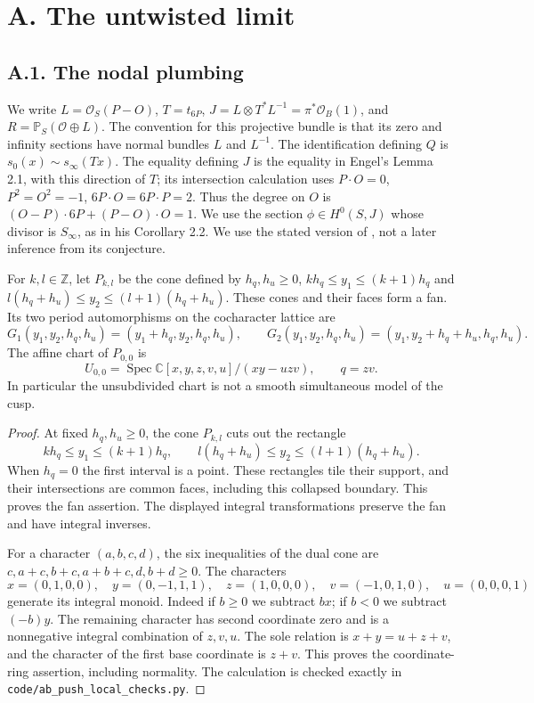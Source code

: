 \section{A. The untwisted limit}
\subsection{A.1. The nodal plumbing}

We write $L=\mathcal O_S(P-O)$, $T=t_{6P}$,
$J=L\otimes T^*L^{-1}=\pi^*\mathcal O_B(1)$, and
$R=\mathbb P_S(\mathcal O\oplus L)$. The convention for this projective
bundle is that its zero and infinity sections have normal bundles
$L$ and $L^{-1}$. The identification defining $Q$ is
$s_0(x)\sim s_\infty(Tx)$. The equality defining $J$ is the equality
in Engel's Lemma 2.1, with this direction of $T$; its intersection
calculation uses $P\cdot O=0$, $P^2=O^2=-1$,
$6P\cdot O=6P\cdot P=2$. Thus the degree on $O$ is
$(O-P)\cdot6P+(P-O)\cdot O=1$. We use the section
$\phi\in H^0(S,J)$ whose divisor is $S_\infty$, as in his
Corollary 2.2. We use the stated version of
\cite{E26}, not a later inference from its conjecture.

\begin{proposition}\label{push:src:A.1.1}\label{push:A11}
For $k,l\in\mathbb Z$, let $P_{k,l}$ be the cone defined by $h_q,h_u\geq0$, $kh_q\leq y_1\leq(k+1)h_q$ and $l(h_q+h_u)\leq y_2\leq(l+1)(h_q+h_u)$. These cones and their faces form a fan. Its two
period automorphisms on the cocharacter lattice are
\[
 G_1(y_1,y_2,h_q,h_u)=(y_1+h_q,y_2,h_q,h_u),\qquad
 G_2(y_1,y_2,h_q,h_u)=(y_1,y_2+h_q+h_u,h_q,h_u).
\]
The affine chart of $P_{0,0}$ is
\[
 U_{0,0}=\operatorname{Spec}\mathbb C[x,y,z,v,u]/(xy-uzv),
 \qquad q=zv.
\]
In particular the unsubdivided chart is not a smooth simultaneous
model of the cusp.
\end{proposition}
\begin{proof}
At fixed $h_q,h_u\geq0$, the cone $P_{k,l}$ cuts out the rectangle
\[
 kh_q\leq y_1\leq(k+1)h_q,\qquad
 l(h_q+h_u)\leq y_2\leq(l+1)(h_q+h_u).
\]
When $h_q=0$ the first interval is a point. These rectangles tile
their support, and their intersections are common faces, including
this collapsed boundary. This proves the fan assertion. The displayed
integral transformations preserve the fan and have integral inverses.

For a character $(a,b,c,d)$, the six inequalities of the dual cone
are $c,a+c,b+c,a+b+c,d,b+d\geq0$. The characters
\[
 x=(0,1,0,0),\quad y=(0,-1,1,1),\quad
 z=(1,0,0,0),\quad v=(-1,0,1,0),\quad u=(0,0,0,1)
\]
generate its integral monoid. Indeed if $b\geq0$ we subtract $b x$;
if $b<0$ we subtract $(-b)y$. The remaining character has second
coordinate zero and is a nonnegative integral combination of $z,v,u$.
The sole relation is $x+y=u+z+v$, and the character of the first
base coordinate is $z+v$. This proves the coordinate-ring assertion,
including normality. The calculation is checked exactly in
\texttt{code/ab\_push\_local\_checks.py}.
\end{proof}

